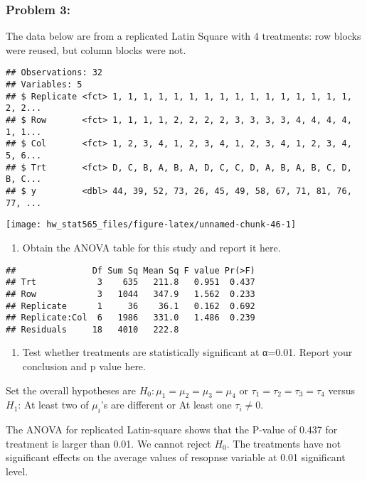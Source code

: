 \documentclass[]{article}
\providecommand{\tightlist}{%
  \setlength{\itemsep}{0pt}\setlength{\parskip}{0pt}}
\begin{document}
\hypertarget{problem-3-3}{%
\subsubsection{Problem 3:}\label{problem-3-3}}

The data below are from a replicated Latin Square with 4 treatments: row
blocks were reused, but column blocks were not.

\begin{verbatim}
## Observations: 32
## Variables: 5
## $ Replicate <fct> 1, 1, 1, 1, 1, 1, 1, 1, 1, 1, 1, 1, 1, 1, 1, 1, 2, 2...
## $ Row       <fct> 1, 1, 1, 1, 2, 2, 2, 2, 3, 3, 3, 3, 4, 4, 4, 4, 1, 1...
## $ Col       <fct> 1, 2, 3, 4, 1, 2, 3, 4, 1, 2, 3, 4, 1, 2, 3, 4, 5, 6...
## $ Trt       <fct> D, C, B, A, B, A, D, C, C, D, A, B, A, B, C, D, B, C...
## $ y         <dbl> 44, 39, 52, 73, 26, 45, 49, 58, 67, 71, 81, 76, 77, ...
\end{verbatim}

\texttt{[image: hw\_stat565\_files/figure-latex/unnamed-chunk-46-1]}

\begin{enumerate}
\def\labelenumi{(\alph{enumi})}
\tightlist
\item
  Obtain the ANOVA table for this study and report it here.
\end{enumerate}

\begin{verbatim}
##               Df Sum Sq Mean Sq F value Pr(>F)
## Trt            3    635   211.8   0.951  0.437
## Row            3   1044   347.9   1.562  0.233
## Replicate      1     36    36.1   0.162  0.692
## Replicate:Col  6   1986   331.0   1.486  0.239
## Residuals     18   4010   222.8
\end{verbatim}

\begin{enumerate}
\def\labelenumi{(\alph{enumi})}
\setcounter{enumi}{1}
\tightlist
\item
  Test whether treatments are statistically significant at α=0.01.
  Report your conclusion and p value here.
\end{enumerate}

Set the overall hypotheses are \(H_0: \mu_1=\mu_2=\mu_3=\mu_4\) or
\(\tau_1=\tau_2=\tau_3=\tau_4\) versus \(H_1\): At least two of
\(\mu_i\)'s are different or At least one \(\tau_i\neq0\).

The ANOVA for replicated Latin-square shows that the P-value of 0.437
for treatment is larger than 0.01. We cannot reject \(H_0\). The
treatments have not significant effects on the average values of
resopnse variable at 0.01 significant level.
\end{document}
